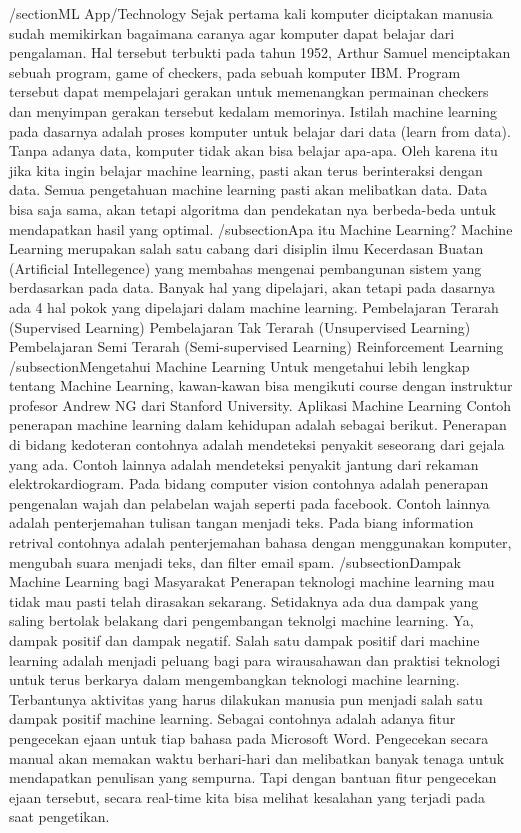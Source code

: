 /section{ML App/Technology}
Sejak pertama kali komputer diciptakan manusia sudah memikirkan bagaimana caranya agar komputer dapat belajar dari pengalaman. Hal tersebut terbukti pada tahun 1952, Arthur Samuel menciptakan sebuah program, game of checkers, pada sebuah komputer IBM. Program tersebut dapat mempelajari gerakan untuk memenangkan permainan checkers dan menyimpan gerakan tersebut kedalam memorinya.
Istilah machine learning pada dasarnya adalah proses komputer untuk belajar dari data (learn from data). Tanpa adanya data, komputer tidak akan bisa belajar apa-apa. Oleh karena itu jika kita ingin belajar machine learning, pasti akan terus berinteraksi dengan data. Semua pengetahuan machine learning pasti akan melibatkan data. Data bisa saja sama, akan tetapi algoritma dan pendekatan nya berbeda-beda untuk mendapatkan hasil yang optimal.
/subsection{Apa itu Machine Learning?}
Machine Learning merupakan salah satu cabang dari disiplin ilmu Kecerdasan Buatan (Artificial Intellegence) yang membahas mengenai pembangunan sistem yang berdasarkan pada data. Banyak hal yang dipelajari, akan tetapi pada dasarnya ada 4 hal pokok yang dipelajari dalam machine learning.
Pembelajaran Terarah (Supervised Learning)
Pembelajaran Tak Terarah (Unsupervised Learning)
Pembelajaran Semi Terarah (Semi-supervised Learning)
Reinforcement Learning
/subsection{Mengetahui Machine Learning}
Untuk mengetahui lebih lengkap tentang Machine Learning, kawan-kawan bisa mengikuti course dengan instruktur profesor Andrew NG dari Stanford University.
Aplikasi Machine Learning
Contoh penerapan machine learning dalam kehidupan adalah sebagai berikut.
Penerapan di bidang kedoteran contohnya adalah mendeteksi penyakit seseorang dari gejala yang ada. Contoh lainnya adalah mendeteksi penyakit jantung dari rekaman elektrokardiogram.
Pada bidang computer vision contohnya adalah penerapan pengenalan wajah dan pelabelan wajah seperti pada facebook. Contoh lainnya adalah penterjemahan tulisan tangan menjadi teks.
Pada biang information retrival contohnya adalah penterjemahan bahasa dengan menggunakan komputer, mengubah suara menjadi teks, dan filter email spam.
/subsection{Dampak Machine Learning bagi Masyarakat}
Penerapan teknologi machine learning mau tidak mau pasti telah dirasakan sekarang. Setidaknya ada dua dampak yang saling bertolak belakang dari pengembangan teknolgi machine learning. Ya, dampak positif dan dampak negatif.
Salah satu dampak positif dari machine learning adalah menjadi peluang bagi para wirausahawan dan praktisi teknologi untuk terus berkarya dalam mengembangkan teknologi machine learning. Terbantunya aktivitas yang harus dilakukan manusia pun menjadi salah satu dampak positif machine learning. Sebagai contohnya adalah adanya fitur pengecekan ejaan untuk tiap bahasa pada Microsoft Word. Pengecekan secara manual akan memakan waktu berhari-hari dan melibatkan banyak tenaga untuk mendapatkan penulisan yang sempurna. Tapi dengan bantuan fitur pengecekan ejaan tersebut, secara real-time kita bisa melihat kesalahan yang terjadi pada saat pengetikan.
